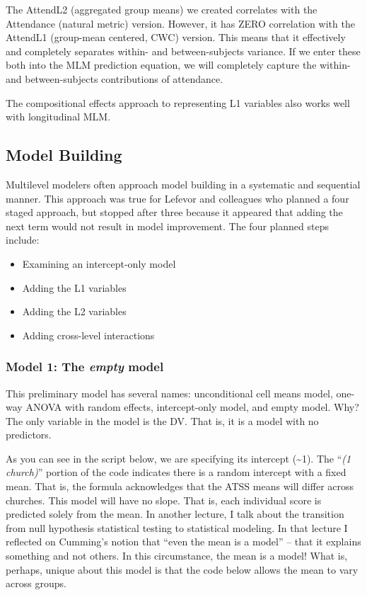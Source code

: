 \documentclass[
  11pt,
]{book}
\providecommand{\tightlist}{%
  \setlength{\itemsep}{0pt}\setlength{\parskip}{0pt}}
\begin{document}
The AttendL2 (aggregated group means) we created correlates with the Attendance (natural metric) version. However, it has ZERO correlation with the AttendL1 (group-mean centered, CWC) version. This means that it effectively and completely separates within- and between-subjects variance. If we enter these both into the MLM prediction equation, we will completely capture the within- and between-subjects contributions of attendance.

The compositional effects approach to representing L1 variables also works well with longitudinal MLM.

\hypertarget{model-building}{%
\subsection{Model Building}\label{model-building}}

Multilevel modelers often approach model building in a systematic and sequential manner. This approach was true for Lefevor and colleagues \citeyearpar{lefevor_homonegativity_2020} who planned a four staged approach, but stopped after three because it appeared that adding the next term would not result in model improvement. The four planned steps include:

\begin{itemize}
\tightlist
\item
  Examining an intercept-only model
\item
  Adding the L1 variables
\item
  Adding the L2 variables
\item
  Adding cross-level interactions
\end{itemize}

\hypertarget{model-1-the-empty-model}{%
\subsubsection{\texorpdfstring{Model 1: The \emph{empty} model}{Model 1: The empty model}}\label{model-1-the-empty-model}}

This preliminary model has several names: unconditional cell means model, one-way ANOVA with random effects, intercept-only model, and empty model. Why? The only variable in the model is the DV. That is, it is a model with no predictors.

As you can see in the script below, we are specifying its intercept (\textasciitilde1). The ``\emph{(1 \textbar{} church)}'' portion of the code indicates there is a random intercept with a fixed mean. That is, the formula acknowledges that the ATSS means will differ across churches. This model will have no slope. That is, each individual score is predicted solely from the mean. In another lecture, I talk about the transition from null hypothesis statistical testing to statistical modeling. In that lecture I reflected on Cumming's \citeyearpar{cumming_new_2014} notion that ``even the mean is a model'' -- that it explains something and not others. In this circumstance, the mean is a model! What is, perhaps, unique about this model is that the code below allows the mean to vary across groups.
\end{document}
